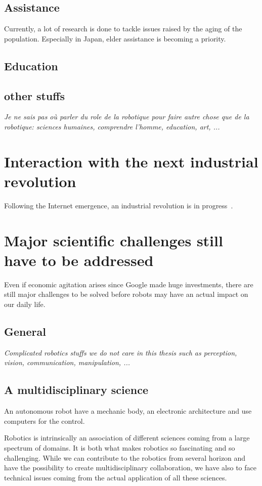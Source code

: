 \subsection{Assistance} %
Currently, a lot of research is done to tackle issues raised by the aging of the population. Especially in Japan, elder assistance is becoming a priority.


\subsection{Education} %


\subsection{other stuffs} %
\emph{Je ne sais pas où parler du role de la robotique pour faire autre chose que de la robotique: sciences humaines, comprendre l'homme, education, art, ...}

\section{Interaction with the next industrial revolution} %
Following the Internet emergence, an industrial revolution is in progress~\cite{anderson2012makers}.


\section{Major scientific challenges still have to be addressed} %

Even if economic agitation arises since Google made huge investments, there are still major challenges to be solved before robots may have an actual impact on our daily life.


\subsection{General} %
\emph{Complicated robotics stuffs we do not care in this thesis such as perception, vision, communication, manipulation, ...}

\subsection{A multidisciplinary science} %
An autonomous robot have a mechanic body, an electronic architecture and use computers for the control.

Robotics is intrinsically an association of different sciences coming from a large spectrum of domains. It is both what makes robotics so fascinating and so challenging. While we can contribute to the robotics from several horizon and have the possibility to create multidisciplinary collaboration, we have also to face technical issues coming from the actual application of all these sciences.

